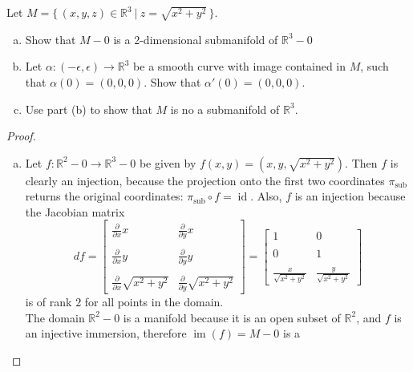 \documentclass{article}
\newenvironment{problem}[2][Problem]{\begin{trivlist}
\item[\hskip \labelsep {\bfseries #1}\hskip \labelsep {\bfseries #2.}]}{\end{trivlist}}
\begin{document}
\begin{problem}{2}
  Let $M = \{\, (x,y,z) \in \mathbb{R}^3\ |\ z = \sqrt{x^2 + y^2} \,\}$.
  \begin{enumerate}[(a)]
    \item Show that $M - 0$ is a 2-dimensional submanifold of
      $\mathbb{R}^3 - 0$
    \item Let $\alpha\colon (-\epsilon, \epsilon) \rightarrow \mathbb{R}^3$ be a
      smooth curve with image contained in $M$, such that $\alpha(0) = (0,0,0)$.
      Show that $\alpha'(0) = (0, 0, 0)$.
    \item Use part (b) to show that $M$ is no a submanifold of $\mathbb{R}^3$.
  \end{enumerate}
\end{problem}

\begin{proof}
  \begin{enumerate}[(a)]
    \item
      Let $f\colon \mathbb{R}^2 - 0 \rightarrow \mathbb{R}^3 -  0$ be given by
      $f(x,y) = (x, y, \sqrt{x^2 + y^2})$. Then $f$ is clearly an injection,
      because the projection onto the first two coordinates $\pi_\text{sub}$
      returns the original coordinates: $\pi_\text{sub} \circ f = \operatorname{id}$.
      Also, $f$ is an injection because the Jacobian matrix \[
        df =
        \begin{bmatrix}
          \frac{\partial}{\partial x}x & \frac{\partial}{\partial y}x\\ \\
          \frac{\partial}{\partial x}y & \frac{\partial}{\partial y}y\\ \\
          \frac{\partial}{\partial x}\sqrt{x^2 + y^2} & \frac{\partial}{\partial y}\sqrt{x^2 + y^2}
        \end{bmatrix} = \begin{bmatrix}
          1 & 0\\ \\
          0 & 1\\ \\
          \frac{x}{\sqrt{x^2 + y^2}} & \frac{y}{\sqrt{x^2 + y^2}}
        \end{bmatrix}
      \] is of rank $2$ for all points in the domain.\\
      The domain $\mathbb{R}^2 - 0$ is a manifold because it is
      an open subset of $\mathbb{R}^2$, and $f$ is an injective immersion,
      therefore $\operatorname{im}(f) = M - 0$ is a

\end{enumerate}
\end{proof}
\end{document}
